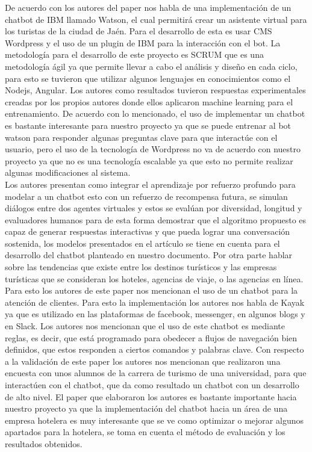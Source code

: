 \documentclass[12pt,a4paper,oneside]{article}
\begin{document}
    De acuerdo con los autores del paper nos habla de una implementación de un chatbot de IBM   llamado Watson, el cual permitirá crear un asistente virtual para los turistas de la ciudad de Jaén. Para el desarrollo de esta es usar CMS Wordpress y el uso de un plugin de IBM para la interacción con el bot. La metodología para el desarrollo de este proyecto es SCRUM que es una metodología ágil ya que permite llevar a cabo el análisis y diseño en cada ciclo, para esto se tuvieron que utilizar algunos lenguajes en conocimientos como el Nodejs, Angular.  Los autores como resultados tuvieron respuestas experimentales creadas por los propios autores donde ellos aplicaron machine learning para el entrenamiento. De acuerdo con lo mencionado, el uso de implementar un chatbot es bastante interesante para nuestro proyecto ya que se puede entrenar al bot watson para responder algunas preguntas clave para que interactúe con el usuario, pero el uso de la tecnología de Wordpress no va de acuerdo con nuestro proyecto ya que no es una tecnología escalable ya que esto no permite realizar algunas modificaciones al sistema.\\Los autores presentan como integrar el aprendizaje por refuerzo profundo para modelar a un chatbot esto con un refuerzo de recompensa futura, se simulan diálogos entre dos agentes virtuales y estos se evalúan por diversidad, longitud y evaluadores humanos para de esta forma demostrar que el algoritmo propuesto es capaz de generar respuestas interactivas y que pueda lograr una conversación sostenida, los modelos presentados en el artículo se tiene en cuenta para el desarrollo del chatbot planteado en nuestro documento. Por otra parte hablar sobre las tendencias que existe entre los destinos turísticos y las empresas turísticas que se consideran los hoteles, agencias de viaje, o las agencias en línea. Para esto los autores de este paper nos mencionan el uso de un chatbot para la atención de clientes. Para esto la implementación los autores nos habla de Kayak ya que es utilizado en las plataformas de facebook, messenger, en algunos blogs y en Slack. Los autores nos mencionan que el uso de este chatbot es mediante reglas, es decir, que está programado para obedecer a flujos de navegación bien definidos, que estos responden a ciertos comandos y palabras clave. Con respecto a la validación de este paper los autores nos mencionan que realizaron una encuesta con unos alumnos de la carrera de turismo de una universidad, para que interactúen con el chatbot, que da como resultado un chatbot con un desarrollo de alto nivel. El paper que elaboraron los autores es bastante importante hacia nuestro proyecto ya que la implementación del chatbot hacia un área de una empresa hotelera es muy interesante que se ve como optimizar o mejorar algunos apartados para la hotelera, se toma en cuenta el método de evaluación y los resultados obtenidos. \\
\end{document}
